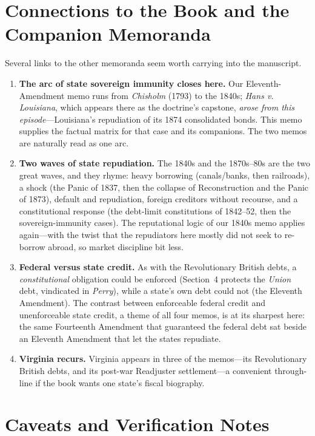 \documentclass[12pt]{article}
\begin{document}
\section{Connections to the Book and the Companion Memoranda}
\label{sec:connections}

Several links to the other memoranda seem worth carrying into the manuscript.
\begin{enumerate}
  \item \textbf{The arc of state sovereign immunity closes here.} Our
    Eleventh-Amendment memo runs from \emph{Chisholm} (1793) to the 1840s;
    \emph{Hans v. Louisiana}, which appears there as the doctrine's capstone,
    \emph{arose from this episode}---Louisiana's repudiation of its 1874
    consolidated bonds. This memo supplies the factual matrix for that case and its
    companions. The two memos are naturally read as one arc.
  \item \textbf{Two waves of state repudiation.} The 1840s and the 1870s--80s are
    the two great waves, and they rhyme: heavy borrowing (canals/banks, then
    railroads), a shock (the Panic of 1837, then the collapse of Reconstruction and
    the Panic of 1873), default and repudiation, foreign creditors without recourse,
    and a constitutional response (the debt-limit constitutions of 1842--52, then the
    sovereign-immunity cases). The reputational logic of our 1840s memo applies
    again---with the twist that the repudiators here mostly did not seek to
    re-borrow abroad, so market discipline bit less.
  \item \textbf{Federal versus state credit.} As with the Revolutionary British
    debts, a \emph{constitutional} obligation could be enforced (Section~4 protects
    the \emph{Union} debt, vindicated in \emph{Perry}), while a state's own debt
    could not (the Eleventh Amendment). The contrast between enforceable federal
    credit and unenforceable state credit, a theme of all four memos, is at its
    sharpest here: the same Fourteenth Amendment that guaranteed the federal debt sat
    beside an Eleventh Amendment that let the states repudiate.
  \item \textbf{Virginia recurs.} Virginia appears in three of the memos---its
    Revolutionary British debts, and its post-war Readjuster settlement---a
    convenient through-line if the book wants one state's fiscal biography.
\end{enumerate}

\section{Caveats and Verification Notes}
\label{sec:caveats}
\end{document}
